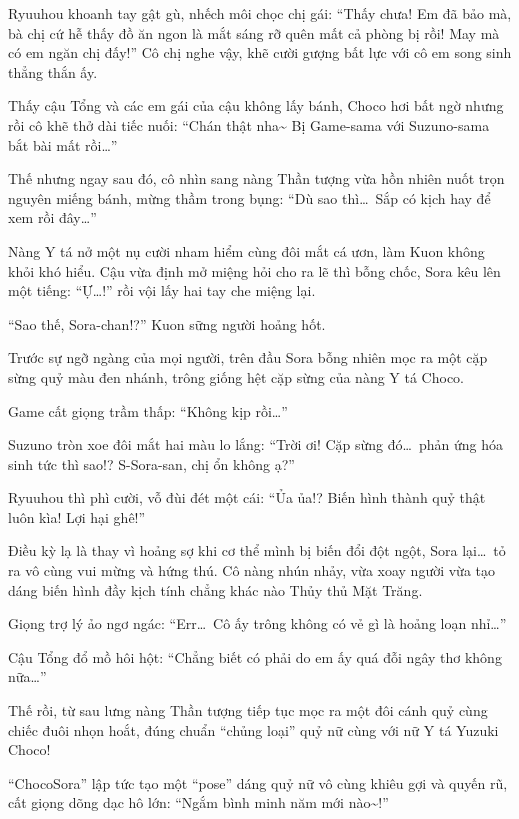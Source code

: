\documentclass[../main.tex]{subfiles}
\begin{document}
Ryuuhou khoanh tay gật gù, nhếch môi chọc chị gái: ``Thấy chưa! Em đã bảo mà, bà chị cứ hễ thấy đồ ăn ngon là mắt sáng rỡ quên mất cả phòng bị rồi! May mà có em ngăn chị đấy!'' Cô chị nghe vậy, khẽ cười gượng bất lực với cô em song sinh thẳng thắn ấy.

Thấy cậu Tổng và các em gái của cậu không lấy bánh, Choco hơi bất ngờ nhưng rồi cô khẽ thở dài tiếc nuối: ``Chán thật nha\~{} Bị Game-sama với Suzuno-sama bắt bài mất rồi\dots''

Thế nhưng ngay sau đó, cô nhìn sang nàng Thần tượng vừa hồn nhiên nuốt trọn nguyên miếng bánh, mừng thầm trong bụng: ``Dù sao thì\dots\ Sắp có kịch hay để xem rồi đây\dots''

Nàng Y tá nở một nụ cười nham hiểm cùng đôi mắt cá ươn, làm Kuon không khỏi khó hiểu. Cậu vừa định mở miệng hỏi cho ra lẽ thì bỗng chốc, Sora kêu lên một tiếng: ``Ự\dots!'' rồi vội lấy hai tay che miệng lại.

``Sao thế, Sora-chan!?'' Kuon sững người hoảng hốt.

Trước sự ngỡ ngàng của mọi người, trên đầu Sora bỗng nhiên mọc ra một cặp sừng quỷ màu đen nhánh, trông giống hệt cặp sừng của nàng Y tá Choco.

Game cất giọng trầm thấp: ``Không kịp rồi\dots''

Suzuno tròn xoe đôi mắt hai màu lo lắng: ``Trời ơi! Cặp sừng đó\dots\ phản ứng hóa sinh tức thì sao!? S-Sora-san, chị ổn không ạ?''

Ryuuhou thì phì cười, vỗ đùi đét một cái: ``Ủa ủa!? Biến hình thành quỷ thật luôn kìa! Lợi hại ghê!''

Điều kỳ lạ là thay vì hoảng sợ khi cơ thể mình bị biến đổi đột ngột, Sora lại\dots\ tỏ ra vô cùng vui mừng và hứng thú. Cô nàng nhún nhảy, vừa xoay người vừa tạo dáng biến hình đầy kịch tính chẳng khác nào Thủy thủ Mặt Trăng.

Giọng trợ lý ảo ngơ ngác: ``Err\dots\ Cô ấy trông không có vẻ gì là hoảng loạn nhỉ\dots''

Cậu Tổng đổ mồ hôi hột: ``Chẳng biết có phải do em ấy quá đỗi ngây thơ không nữa\dots''

Thế rồi, từ sau lưng nàng Thần tượng tiếp tục mọc ra một đôi cánh quỷ cùng chiếc đuôi nhọn hoắt, đúng chuẩn ``chủng loại'' quỷ nữ cùng với nữ Y tá Yuzuki Choco!

``ChocoSora'' lập tức tạo một ``pose'' dáng quỷ nữ vô cùng khiêu gợi và quyến rũ, cất giọng dõng dạc hô lớn: ``Ngắm bình minh năm mới nào\~{}!''

\end{document}
